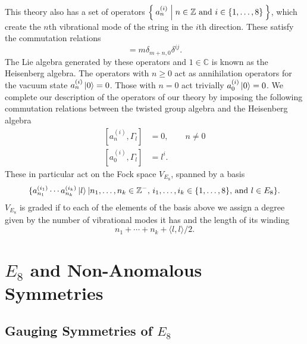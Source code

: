 \documentclass{article}
\begin{document}
This theory also has a set of operators $\Set{a_n^{(i)}|n\in\mathbb{Z}\text{ and }i\in\{1,\dots,8\}}$, which create the $n$th vibrational mode of the string in the $i$th direction. These satisfy the commutation relations
\begin{equation}
[\alpha_n^{(i)},\alpha_m^{(j)}]=m\delta_{m+n,0}\delta^{ij}.
\end{equation}
The Lie algebra generated by these operators and $1\in\mathbb{C}$ is known as the Heisenberg algebra. The operators with $n\geq 0$ act as annihilation operators for the vacuum state $a_n^{(i)}\ket{0}=0$. Those with $n=0$ act trivially $a_0^{(i)}\ket{0}=0$. We complete our description of the operators of our theory by imposing the following commutation relations between the twisted group algebra and the Heisenberg algebra
\begin{equation}
\begin{aligned}
[a_n^{(i)},\Gamma_l]&=0,\qquad n\neq 0\\
[a_0^{(i)},\Gamma_l]&=l^i.
\end{aligned}
\end{equation}
These in particular act on the Fock space $V_{E_8}$, spanned by a basis 
\begin{equation}
\{a_{n_1}^{(i_1)}\cdots a_{n_k}^{(i_k)}\ket{l}|n_1,\dots,n_k\in\mathbb{Z}^-\textrm{, }i_1,\dots,i_k\in\{1,\dots,8\}\textrm{, and }l\in E_8\}.
\end{equation}
$V_{E_8}$ is graded if to each of the elements of the basis above we assign a degree given by the number of vibrational modes it has and the length of its winding
\begin{equation}
n_1+\cdots+n_k+\langle l,l\rangle/2.
\end{equation}

\section{\texorpdfstring{$E_8$}{E8} and Non-Anomalous Symmetries}

\subsection{Gauging Symmetries of \texorpdfstring{$E_8$}{E8}}

\end{document}
